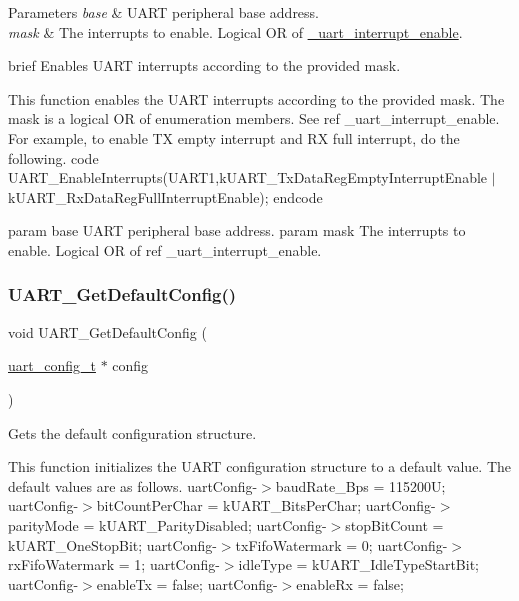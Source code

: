 \begin{DoxyParams}{Parameters}
{\em base} & U\+A\+RT peripheral base address. \\
\hline
{\em mask} & The interrupts to enable. Logical OR of \mbox{\hyperlink{group__uart__driver_ga700f3cd8e3800273a1591307cab6311c}{\+\_\+uart\+\_\+interrupt\+\_\+enable}}.\\
\hline
\end{DoxyParams}
brief Enables U\+A\+RT interrupts according to the provided mask.

This function enables the U\+A\+RT interrupts according to the provided mask. The mask is a logical OR of enumeration members. See ref \+\_\+uart\+\_\+interrupt\+\_\+enable. For example, to enable TX empty interrupt and RX full interrupt, do the following. code U\+A\+R\+T\+\_\+\+Enable\+Interrupts(U\+A\+R\+T1,k\+U\+A\+R\+T\+\_\+\+Tx\+Data\+Reg\+Empty\+Interrupt\+Enable $\vert$ k\+U\+A\+R\+T\+\_\+\+Rx\+Data\+Reg\+Full\+Interrupt\+Enable); endcode

param base U\+A\+RT peripheral base address. param mask The interrupts to enable. Logical OR of ref \+\_\+uart\+\_\+interrupt\+\_\+enable. \mbox{\label{group__uart__driver_ga47c7c09e04a0497f4530d553e27d96c5}} 
\subsubsection{\texorpdfstring{UART\_GetDefaultConfig()}{UART\_GetDefaultConfig()}}
{\footnotesize\ttfamily void U\+A\+R\+T\+\_\+\+Get\+Default\+Config (\begin{DoxyParamCaption}\item[{\mbox{\hyperlink{group__uart__driver_ga032da70848aac8bc9c3904a32bde5899}{uart\+\_\+config\+\_\+t}} $\ast$}]{config }\end{DoxyParamCaption})}



Gets the default configuration structure. 

This function initializes the U\+A\+RT configuration structure to a default value. The default values are as follows. uart\+Config-\/$>$baud\+Rate\+\_\+\+Bps = 115200U; uart\+Config-\/$>$bit\+Count\+Per\+Char = k\+U\+A\+R\+T\+\_\+Bits\+Per\+Char; uart\+Config-\/$>$parity\+Mode = k\+U\+A\+R\+T\+\_\+\+Parity\+Disabled; uart\+Config-\/$>$stop\+Bit\+Count = k\+U\+A\+R\+T\+\_\+\+One\+Stop\+Bit; uart\+Config-\/$>$tx\+Fifo\+Watermark = 0; uart\+Config-\/$>$rx\+Fifo\+Watermark = 1; uart\+Config-\/$>$idle\+Type = k\+U\+A\+R\+T\+\_\+\+Idle\+Type\+Start\+Bit; uart\+Config-\/$>$enable\+Tx = false; uart\+Config-\/$>$enable\+Rx = false;



